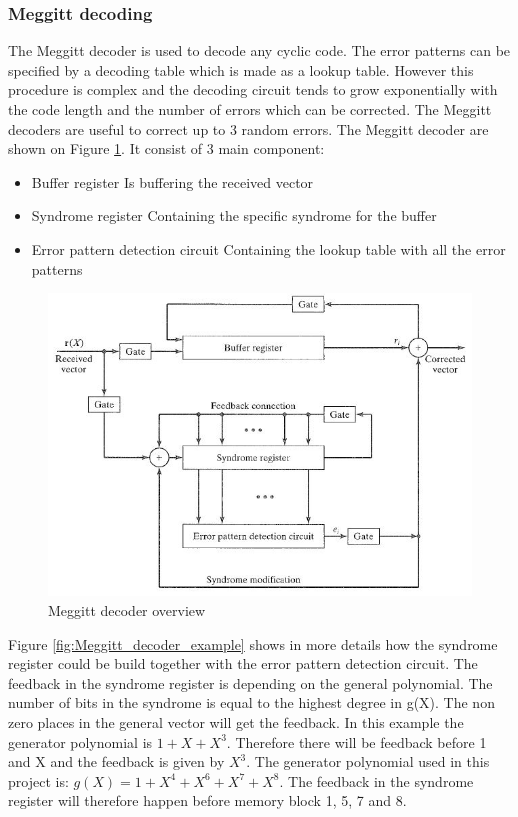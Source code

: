 \documentclass[Main]{subfiles}
\begin{document}
\subsubsection{Meggitt decoding} 
The Meggitt decoder is used to decode any cyclic code.
The error patterns can be specified by a decoding table which is made as a lookup table.
However this procedure is complex and the decoding circuit tends to grow exponentially with the code length and the number of errors which can be corrected.
The Meggitt decoders are useful to correct up to 3 random errors.
The Meggitt decoder are shown on Figure \ref{fig:Meggitt_decoder}. It consist of 3 main component:
\begin{itemize}
\item Buffer register
\subitem Is buffering the received vector
\item Syndrome register
\subitem Containing the specific syndrome for the buffer
\item Error pattern detection circuit
\subitem Containing the lookup table with all the error patterns
\end{itemize}

\begin{figure}[H]
\centering
\includegraphics[width=0.7\linewidth]{./Picture/Meggitt_decoder}
\caption[The Meggitt decoder]{Meggitt decoder overview}
\label{fig:Meggitt_decoder}
\end{figure}

Figure \ref{fig:Meggitt_decoder_example} shows in more details how the syndrome register could be build together with the error pattern detection circuit.
The feedback in the syndrome register is depending on the general polynomial.
The number of bits in the syndrome is equal to the highest degree in g(X).
The non zero places in the general vector will get the feedback.
In this example the generator polynomial is $1+X+X^3$.
Therefore there will be feedback before 1 and X and the feedback is given by $X^3$.
The generator polynomial used in this project is: $g(X)=1+X^4+X^6+X^7+X^8$.
The feedback in the syndrome register will therefore happen before memory block 1, 5, 7 and 8. 
\end{document}
